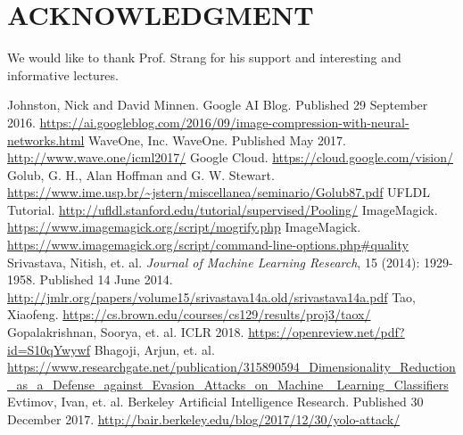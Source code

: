 \documentclass[letterpaper, 12 pt, conference]{ieeeconf}  %
\begin{document}

\section*{ACKNOWLEDGMENT}

We would like to thank Prof. Strang for his support and interesting and informative lectures.

\begin{thebibliography}{99}

 Johnston, Nick and David Minnen.  Google AI Blog. Published 29 September 2016. \url{https://ai.googleblog.com/2016/09/image-compression-with-neural-networks.html}
  WaveOne, Inc. WaveOne. Published May 2017. \url{http://www.wave.one/icml2017/}
  Google Cloud. \url{https://cloud.google.com/vision/}
 Golub, G. H., Alan Hoffman and G. W. Stewart.  \url{https://www.ime.usp.br/~jstern/miscellanea/seminario/Golub87.pdf}
  UFLDL Tutorial. \url{http://ufldl.stanford.edu/tutorial/supervised/Pooling/}
  ImageMagick. \url{https://www.imagemagick.org/script/mogrify.php}
  ImageMagick. \url{https://www.imagemagick.org/script/command-line-options.php\#quality}
 Srivastava, Nitish, et. al.  {\it Journal of Machine Learning Research}, 15 (2014): 1929-1958.
	Published 14 June 2014. \url{http://jmlr.org/papers/volume15/srivastava14a.old/srivastava14a.pdf}
 Tao, Xiaofeng.  \url{https://cs.brown.edu/courses/cs129/results/proj3/taox/}
 Gopalakrishnan, Soorya, et. al.  ICLR 2018. \url{https://openreview.net/pdf?id=S10qYwywf}
 Bhagoji, Arjun, et. al.  \url{https://www.researchgate.net/publication/315890594\_Dimensionality\_Reduction\_as\_a\_Defense\_against\_Evasion\_Attacks\_on\_Machine\_ Learning\_Classifiers}
 Evtimov, Ivan, et. al.  Berkeley Artificial Intelligence Research. Published 30 December 2017. \url{http://bair.berkeley.edu/blog/2017/12/30/yolo-attack/}

\end{thebibliography}
\end{document}
